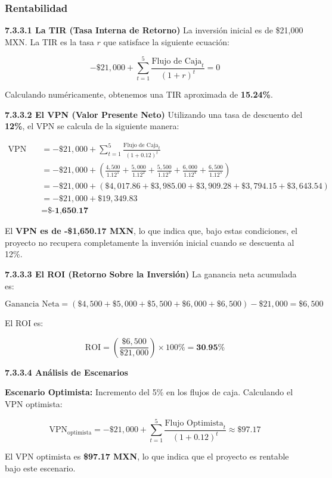 \documentclass[a4paper,12pt]{article}
\begin{document}
\subsubsection{Rentabilidad}
\textbf{7.3.3.1 La TIR (Tasa Interna de Retorno)}
La inversión inicial es de \$21,000 MXN. La TIR es la tasa \( r \) que satisface la siguiente ecuación:

\[
- \$21,000 + \sum_{t=1}^{5} \frac{\text{Flujo de Caja}_t}{(1 + r)^t} = 0
\]

Calculando numéricamente, obtenemos una TIR aproximada de \textbf{15.24\%}.

\textbf{7.3.3.2 El VPN (Valor Presente Neto)}
Utilizando una tasa de descuento del \textbf{12\%}, el VPN se calcula de la siguiente manera:

\begin{align*}
    \text{VPN} \quad &= -\$21,000 + \sum_{t=1}^{5} \frac{\text{Flujo de Caja}_t}{(1 + 0.12)^t} \\
    &= -\$21,000 + \left( \frac{4,500}{1.12^1} + \frac{5,000}{1.12^2} + \frac{5,500}{1.12^3} + \frac{6,000}{1.12^4} + \frac{6,500}{1.12^5} \right) \\
    &= -\$21,000 + (\$4,017.86 + \$3,985.00 + \$3,909.28 + \$3,794.15 + \$3,643.54) \\
    &= -\$21,000 + \$19,349.83 \\
    &= \textbf{\$-1,650.17}
\end{align*}

El \textbf{VPN es de -\$1,650.17 MXN}, lo que indica que, bajo estas condiciones, el proyecto no recupera completamente la inversión inicial cuando se descuenta al 12\%.

\textbf{7.3.3.3 El ROI (Retorno Sobre la Inversión)}
La ganancia neta acumulada es:

\[
\text{Ganancia Neta} = (\$4,500 + \$5,000 + \$5,500 + \$6,000 + \$6,500) - \$21,000 = \$6,500
\]

El ROI es:

\[
\text{ROI} = \left( \frac{\$6,500}{\$21,000} \right) \times 100\% = \textbf{30.95\%}
\]

\textbf{7.3.3.4 Análisis de Escenarios}

\textbf{Escenario Optimista:} Incremento del 5\% en los flujos de caja. Calculando el VPN optimista:

\[
\text{VPN}_{\text{optimista}} = -\$21,000 + \sum_{t=1}^{5} \frac{\text{Flujo Optimista}_t}{(1 + 0.12)^t} \approx \$97.17
\]

El VPN optimista es \textbf{\$97.17 MXN}, lo que indica que el proyecto es rentable bajo este escenario.
\end{document}
